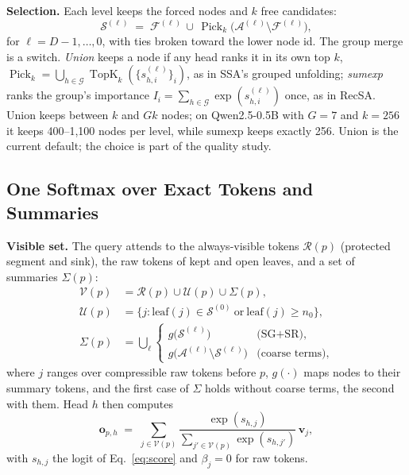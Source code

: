 \documentclass[10pt,twocolumn]{article}
\newcommand{\para}[1]{\noindent\textbf{#1}\hspace{0.5em}}
\newcommand{\topk}{\operatorname{TopK}_k}
\begin{document}
\para{Selection.}
Each level keeps the forced nodes and $k$ free candidates:
\begin{equation}
  \mathcal{S}^{(\ell)} \;=\; \mathcal{F}^{(\ell)} \,\cup\,
  \operatorname{Pick}_k\!\bigl(\mathcal{A}^{(\ell)}\setminus\mathcal{F}^{(\ell)}\bigr),
  \label{eq:sel}
\end{equation}
for $\ell=D-1,\dots,0$, with ties broken toward the lower node id. The group merge is a
switch. \emph{Union} keeps a node if any head ranks it in its own top $k$,
$\operatorname{Pick}_k=\bigcup_{h\in\mathcal{G}}\topk(\{s^{(\ell)}_{h,i}\}_i)$, as in SSA's
grouped unfolding; \emph{sumexp} ranks the group's importance
$I_i=\sum_{h\in\mathcal{G}}\exp(s^{(\ell)}_{h,i})$ once, as in RecSA. Union keeps between $k$
and $Gk$ nodes; on Qwen2.5-0.5B with $G=7$ and $k=256$ it keeps 400--1,100 nodes per level,
while sumexp keeps exactly 256. Union is the current default; the choice is part of the
quality study.

\subsection{One Softmax over Exact Tokens and Summaries}
\label{sec:softmax}

\para{Visible set.}
The query attends to the always-visible tokens $\mathcal{R}(p)$ (protected segment and sink),
the raw tokens of kept and open leaves, and a set of summaries $\Sigma(p)$:
\begin{equation}
\begin{aligned}
  \mathcal{V}(p) &= \mathcal{R}(p) \cup \mathcal{U}(p) \cup \Sigma(p),\\
  \mathcal{U}(p) &= \bigl\{ j : \mathrm{leaf}(j)\in\mathcal{S}^{(0)}\ \text{or}\
     \mathrm{leaf}(j)\ge n_0 \bigr\},\\
  \Sigma(p) &= \textstyle\bigcup_{\ell}
     \begin{cases}
       g\bigl(\mathcal{S}^{(\ell)}\bigr) & \text{(SG+SR)},\\
       g\bigl(\mathcal{A}^{(\ell)}\setminus\mathcal{S}^{(\ell)}\bigr) & \text{(coarse terms)},
     \end{cases}
\end{aligned}
\label{eq:visible}
\end{equation}
where $j$ ranges over compressible raw tokens before $p$, $g(\cdot)$ maps nodes to their
summary tokens, and the first case of $\Sigma$ holds without coarse terms, the second with
them. Head $h$ then computes
\begin{equation}
  \mathbf{o}_{p,h} \;=\; \sum_{j\in\mathcal{V}(p)}
   \frac{\exp(s_{h,j})}{\sum_{j'\in\mathcal{V}(p)}\exp(s_{h,j'})}\,\mathbf{v}_j,
  \label{eq:attn}
\end{equation}
with $s_{h,j}$ the logit of Eq.~\eqref{eq:score} and $\beta_j=0$ for raw tokens.
\end{document}
